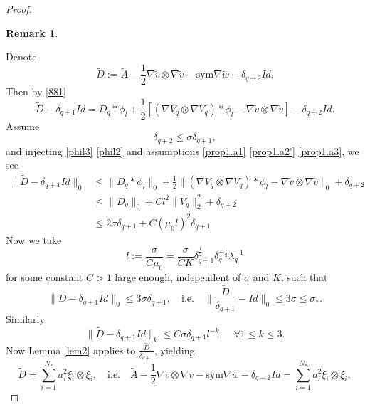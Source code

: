 \documentclass[reqno,12pt]{amsart}
\numberwithin{equation}{section}
\theoremstyle{plain}
\theoremstyle{definition}
\newtheorem{rem}[thm]{Remark}
\newcommand{\sym}{\text{sym}}
\begin{document}
\begin{proof}
\begin{rem}
\end{rem}
Denote
\begin{equation*}
    \tilde D := \tilde A-\frac{1}{2} \nabla\tilde v\otimes\nabla\tilde v-\sym\nabla\tilde w-\delta_{q+2}Id.
\end{equation*}
Then by \eqref{881}
\begin{equation*}
    \tilde D-\delta_{q+1}Id= D_q*\phi_l+\frac{1}{2}[(\nabla V_q\otimes\nabla V_q)*\phi_l-\nabla\tilde v\otimes\nabla\tilde v]-\delta_{q+2}Id.
\end{equation*}
Assume
\begin{equation}\label{ineq02}
    \delta_{q+2}\le {\sigma}\delta_{q+1},
\end{equation}
and injecting \eqref{phil3} \eqref{phil2} and assumptions \eqref{prop1.a1} \eqref{prop1.a2'} \eqref{prop1.a3}, we see
\begin{align*}
    \|\tilde D-\delta_{q+1}Id\|_0
    &\le \|D_q*\phi_l\|_0+\frac{1}{2}\|(\nabla V_q\otimes\nabla V_q)*\phi_l-\nabla\tilde v\otimes\nabla\tilde v\|_0+\delta_{q+2}\\
    &\le \|D_q\|_0 + Cl^2\|V_q\|_2^2 + \delta_{q+2}\\
    &\le 2{\sigma}\delta_{q+1}+C(\mu_0 l)^2\delta_{q+1}
\end{align*}
Now we take
\begin{equation}\label{l}
    l:=\frac{\sigma}{C\mu_0} = \frac{\sigma}{CK}\delta_{q+1}^\frac{1}{2}\delta_q^{-\frac{1}{2}}\lambda_q^{-1}
\end{equation}
for some constant $C>1$ large enough, independent of $\sigma$ and $K$,  
such that
\begin{equation*}
    \|\tilde D-\delta_{q+1}Id\|_0\le 3\sigma\delta_{q+1},
    \quad\text{i.e.}\quad
    \|\frac{\tilde D}{\delta_{q+1}}-Id\|_0\le 3\sigma\le\sigma_*.
\end{equation*}
Similarly 
\begin{equation*}
    \|\tilde D-\delta_{q+1}Id\|_k \le C\sigma\delta_{q+1}l^{-k},\quad\forall 1\le k\le 3.
\end{equation*}
Now Lemma \ref{lem2} applies to $\frac{\tilde D}{\delta_{q+1}}$, yielding
\begin{equation}\label{882}
    \tilde D=\sum_{i=1}^{N_*}a_i^2\xi_i\otimes\xi_i,\quad\text{i.e.}\quad
    \tilde A-\frac{1}{2} \nabla\tilde v\otimes\nabla\tilde v-\sym\nabla\tilde w-\delta_{q+2}Id=\sum_{i=1}^{N_*}a_i^2\xi_i\otimes\xi_i,

\end{equation}
\end{proof}
\end{document}
